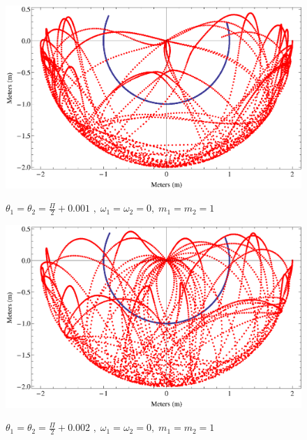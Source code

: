 \documentclass{report}
\begin{document}
\begin{enumerate}
\begin{figure}[H]
\centering \caption{$\displaystyle \theta_1=\theta_2=\frac{\Pi}{2}+0.001$ $,\;\omega_1=\omega_2=0,\; m_1=m_2=1$}
\includegraphics[scale=.37]{pihalves001.eps}
\label{fatEarth}
\end{figure}

\begin{figure}[H]
\centering \caption{$\displaystyle \theta_1=\theta_2=\frac{\Pi}{2}+0.002$ $,\;\omega_1=\omega_2=0,\; m_1=m_2=1$}
\includegraphics[scale=.364]{pihalves002.eps}
\label{fatEarth}
\end{figure}

\end{enumerate}
\end{document}
